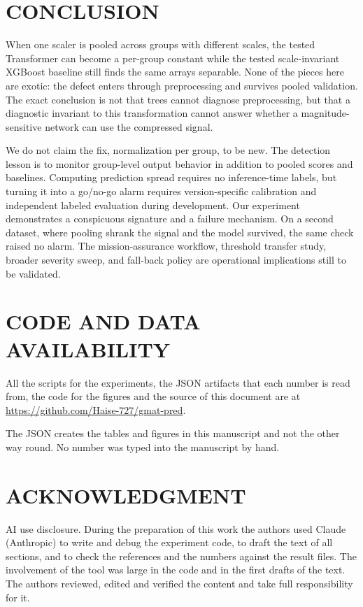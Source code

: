 \documentclass{IEEEtaes}
\begin{document}
\section{CONCLUSION}
\label{sec:conclusion}

When one scaler is pooled across groups with different scales, the tested Transformer can become a per-group constant while the tested scale-invariant XGBoost baseline still finds the same arrays separable. None of the pieces here are exotic: the defect enters through preprocessing and survives pooled validation. The exact conclusion is not that trees cannot diagnose preprocessing, but that a diagnostic invariant to this transformation cannot answer whether a magnitude-sensitive network can use the compressed signal.

We do not claim the fix, normalization per group, to be new. The detection lesson is to monitor group-level output behavior in addition to pooled scores and baselines. Computing prediction spread requires no inference-time labels, but turning it into a go/no-go alarm requires version-specific calibration and independent labeled evaluation during development. Our experiment demonstrates a conspicuous signature and a failure mechanism. On a second dataset, where pooling shrank the signal and the model survived, the same check raised no alarm. The mission-assurance workflow, threshold transfer study, broader severity sweep, and fall-back policy are operational implications still to be validated.

\section{CODE AND DATA AVAILABILITY}
\label{sec:code}

All the scripts for the experiments, the JSON artifacts that each number is read from, the code for the figures and the source of this document are at \url{https://github.com/Haise-727/gmat-pred}.

The JSON creates the tables and figures in this manuscript and not the other way round. No number was typed into the manuscript by hand.

\section*{ACKNOWLEDGMENT}
AI use disclosure. During the preparation of this work the authors used Claude (Anthropic) to write and debug the experiment code, to draft the text of all sections, and to check the references and the numbers against the result files. The involvement of the tool was large in the code and in the first drafts of the text. The authors reviewed, edited and verified the content and take full responsibility for it.
\end{document}
